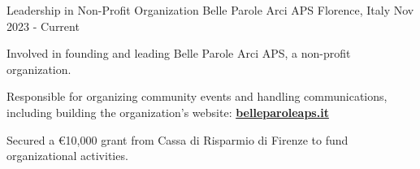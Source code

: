 

\begin{cventries}


  \cventry
    {Leadership in Non-Profit Organization} %
    {Belle Parole Arci APS} %
    {Florence, Italy} %
    {Nov 2023 - Current} %
    {
      \begin{cvitems} %
        \item {Involved in founding and leading Belle Parole Arci APS, a non-profit organization.}
        \item {Responsible for organizing community events and handling communications, including building the organization's website: \href{http://belleparoleaps.it}{\textbf{belleparoleaps.it}}}
        \item {Secured a €10,000 grant from Cassa di Risparmio di Firenze to fund organizational activities.}
      \end{cvitems}
    }



\end{cventries}

